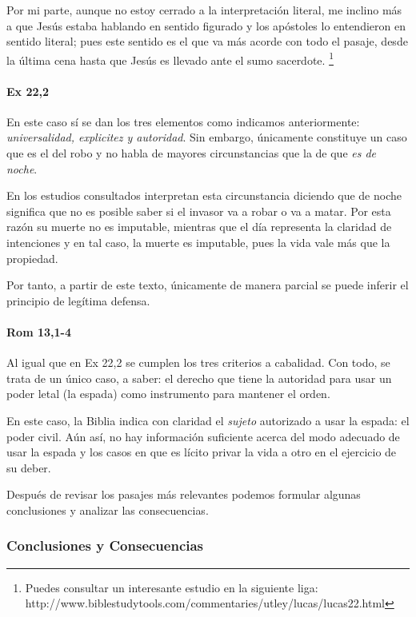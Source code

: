 \documentclass{article}
\begin{document}
Por mi parte, aunque no estoy cerrado a la interpretaci\'on literal, me inclino m\'as a que Jes\'us estaba hablando en sentido figurado y los ap\'ostoles lo entendieron en sentido literal; pues este sentido es el que va m\'as acorde con todo el pasaje, desde la \'ultima cena hasta que Jes\'us es llevado ante el sumo sacerdote.%
    \footnote{Puedes consultar un interesante estudio en la siguiente liga: http://www.biblestudytools.com/commentaries/utley/lucas/lucas22.html}

\paragraph{Ex 22,2}

En este caso s\'{i} se dan los tres elementos como indicamos anteriormente: \emph{universalidad, explicitez y autoridad}. Sin embargo, \'unicamente constituye un caso que es el del robo y no habla de mayores circunstancias que la de que \emph{es de noche}.

En los estudios consultados interpretan esta circunstancia diciendo que de noche significa que no es posible saber si el invasor va a robar o va a matar. Por esta raz\'on su muerte no es imputable, mientras que el d\'{i}a representa la claridad de intenciones y en tal caso, la muerte es imputable, pues la vida vale m\'as que la propiedad.

Por tanto, a partir de este texto, \'unicamente de manera parcial se puede inferir el principio de leg\'{i}tima defensa.

\paragraph{Rom 13,1-4}

Al igual que en Ex 22,2 se cumplen los tres criterios a cabalidad. Con todo, se trata de un \'unico caso, a saber: el derecho que tiene la autoridad para usar un poder letal (la espada) como instrumento para mantener el orden.

En este caso, la Biblia indica con claridad el \emph{sujeto} autorizado a usar la espada: el poder civil. A\'un as\'{i}, no hay informaci\'on suficiente acerca del modo adecuado de usar la espada y los casos en que es l\'{i}cito privar la vida a otro en el ejercicio de su deber.

Despu\'es de revisar los pasajes m\'as relevantes podemos formular algunas conclusiones y analizar las consecuencias.

\subsubsection{Conclusiones y Consecuencias}
\end{document}
